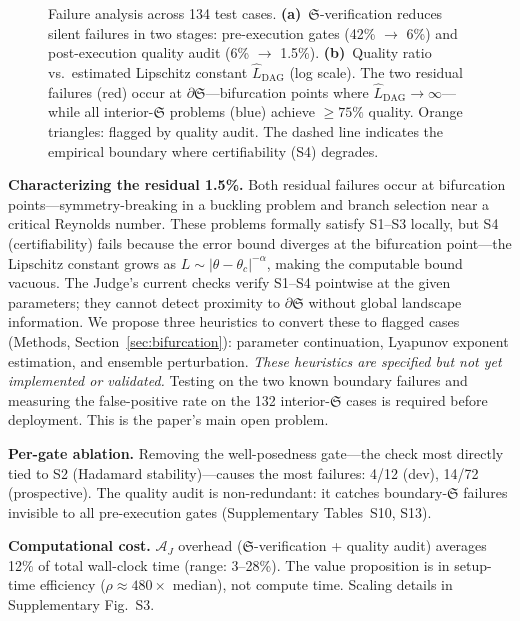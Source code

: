 \documentclass[11pt,a4paper]{article}
\newcommand{\Sclass}{\mathfrak{S}}
\newcommand{\Agent}{\mathcal{A}}
\begin{document}
\begin{figure}[htbp]
\caption{Failure analysis across 134 test cases. \textbf{(a)}~$\Sclass$-verification reduces silent failures in two stages: pre-execution gates (42\% $\to$ 6\%) and post-execution quality audit (6\% $\to$ 1.5\%). \textbf{(b)}~Quality ratio vs.\ estimated Lipschitz constant $\hat{L}_{\text{DAG}}$ (log scale). The two residual failures (red) occur at $\partial \Sclass$---bifurcation points where $\hat{L}_{\text{DAG}} \to \infty$---while all interior-$\Sclass$ problems (blue) achieve $\geq 75\%$ quality. Orange triangles: flagged by quality audit. The dashed line indicates the empirical boundary where certifiability (S4) degrades.}
\label{fig:failure}
\end{figure}

\textbf{Characterizing the residual 1.5\%.} Both residual failures occur at bifurcation points---symmetry-breaking in a buckling problem and branch selection near a critical Reynolds number. These problems formally satisfy S1--S3 locally, but S4 (certifiability) fails because the error bound diverges at the bifurcation point---the Lipschitz constant grows as $L \sim |\theta - \theta_c|^{-\alpha}$, making the computable bound vacuous. The Judge's current checks verify S1--S4 pointwise at the given parameters; they cannot detect proximity to $\partial \Sclass$ without global landscape information. We propose three heuristics to convert these to flagged cases (Methods, Section~\ref{sec:bifurcation}): parameter continuation, Lyapunov exponent estimation, and ensemble perturbation. \emph{These heuristics are specified but not yet implemented or validated.} Testing on the two known boundary failures and measuring the false-positive rate on the 132 interior-$\Sclass$ cases is required before deployment. This is the paper's main open problem.

\textbf{Per-gate ablation.} Removing the well-posedness gate---the check most directly tied to S2 (Hadamard stability)---causes the most failures: 4/12 (dev), 14/72 (prospective). The quality audit is non-redundant: it catches boundary-$\Sclass$ failures invisible to all pre-execution gates (Supplementary Tables~S10, S13).

\textbf{Computational cost.} $\Agent_J$ overhead ($\Sclass$-verification + quality audit) averages 12\% of total wall-clock time (range: 3--28\%). The value proposition is in setup-time efficiency ($\rho \approx 480\times$ median), not compute time. Scaling details in Supplementary Fig.~S3.
\end{document}
